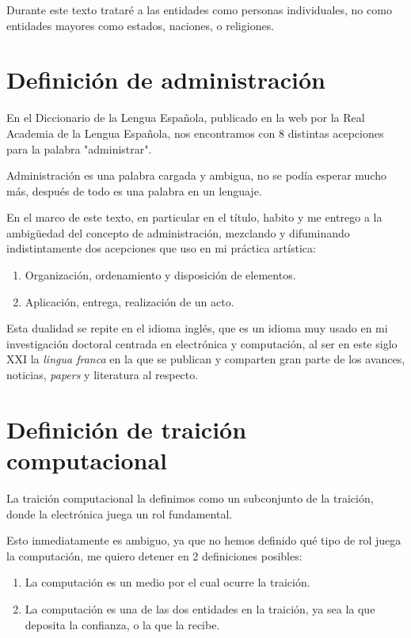 \documentclass{article}
\begin{document}
Durante este texto trataré a las entidades como personas individuales, no como entidades mayores como estados, naciones, o religiones.

\clearpage

\section{Definición de administración}

En el Diccionario de la Lengua Española, publicado en la web por la Real Academia de la Lengua Española, nos encontramos con 8 distintas acepciones para la palabra "administrar"\cite{administrar}.

Administración es una palabra cargada y ambigua, no se podía esperar mucho más, después de todo es una palabra en un lenguaje.

En el marco de este texto, en particular en el título, habito y me entrego a la ambigüedad del concepto de administración, mezclando y difuminando indistintamente dos acepciones que uso en mi práctica artística:


\begin{enumerate}
    \item Organización, ordenamiento y disposición de elementos.
    \item Aplicación, entrega, realización de un acto.
\end{enumerate}

Esta dualidad se repite en el idioma inglés, que es un idioma muy usado en mi investigación doctoral centrada en electrónica y computación, al ser en este siglo XXI la \textit{lingua franca} en la que se publican y comparten gran parte de los avances, noticias, \textit{papers} y literatura al respecto.

\clearpage

\section{Definición de traición computacional}

La traición computacional la definimos como un subconjunto de la traición, donde la electrónica juega un rol fundamental.

Esto inmediatamente es ambiguo, ya que no hemos definido qué tipo de rol juega la computación, me quiero detener en  2 definiciones posibles:

\begin{enumerate}
    \item La computación es un medio por el cual ocurre la traición.
    \item La computación es una de las dos entidades en la traición, ya sea la que deposita la confianza, o la que la recibe.
\end{enumerate}
\end{document}
